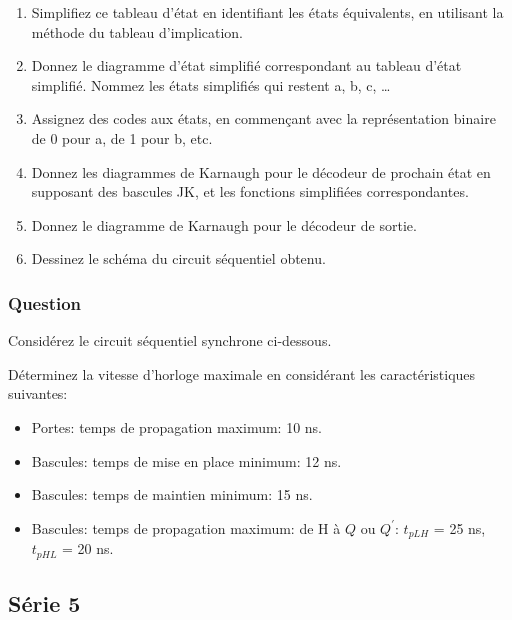 \documentclass[11pt]{article}
\begin{document}
\begin{enumerate}
\item Simplifiez ce tableau d'état en identifiant les états
équivalents, en utilisant la méthode du tableau d'implication.

\item Donnez le diagramme d'état simplifié correspondant au tableau
d'état simplifié. Nommez les états simplifiés qui restent a,
b, c, \dots{}

\item Assignez des codes aux états, en commençant avec la
représentation binaire de 0 pour a, de 1 pour b, etc.

\item Donnez les diagrammes de Karnaugh pour le décodeur de prochain
état en supposant des bascules JK, et les fonctions simplifiées
correspondantes.

\item Donnez le diagramme de Karnaugh pour le décodeur de sortie.

\item Dessinez le schéma du circuit séquentiel obtenu.
\end{enumerate}

\subsubsection*{Question}
\label{sec:orgbcd5589}
Considérez le circuit séquentiel synchrone ci-dessous.
\begin{center}

\end{center}

Déterminez la vitesse d'horloge maximale en considérant les
caractéristiques suivantes:

\begin{itemize}
\item Portes: temps de propagation maximum: 10 ns.

\item Bascules: temps de mise en place minimum: 12 ns.

\item Bascules: temps de maintien minimum: 15 ns.

\item Bascules: temps de propagation maximum: de H à \(Q\) ou
\(Q^{\prime}\): \(t_{pLH}\) = 25 ns, \(t_{pHL}\) = 20 ns.
\end{itemize}

\subsection*{Série 5}
\label{sec:org8a21511}
\end{document}
